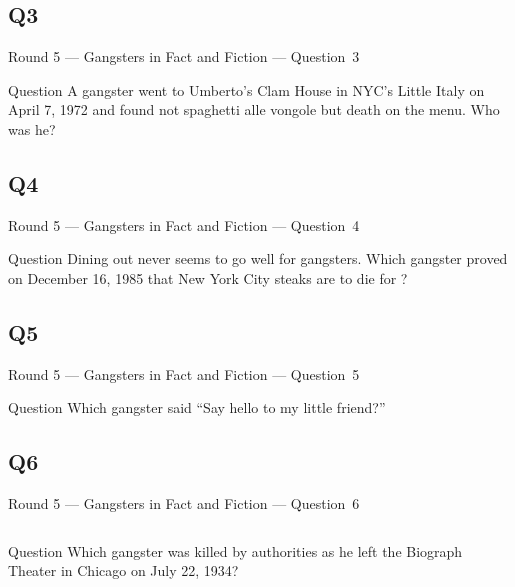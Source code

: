 \documentclass[11pt]{beamer}
\begin{document}
\subsection*{Q3}
\begin{frame}[t]{Round 5 --- Gangsters in Fact and Fiction --- \mbox{Question 3}}
\begin{block}{Question}
A gangster went to Umberto's Clam House in NYC's Little Italy on April 7, 1972 and found not spaghetti alle vongole but death on the menu.  Who was he?
\end{block}
\end{frame}
\subsection*{Q4}
\begin{frame}[t]{Round 5 --- Gangsters in Fact and Fiction --- \mbox{Question 4}}
\begin{block}{Question}
Dining out never seems to go well for gangsters. Which gangster proved on December 16, 1985 that New York City steaks are to die for ?
\end{block}
\end{frame}
\subsection*{Q5}
\begin{frame}[t]{Round 5 --- Gangsters in Fact and Fiction --- \mbox{Question 5}}
\begin{block}{Question}
Which gangster said ``Say hello to my little friend?''
\end{block}
\end{frame}
\subsection*{Q6}
\begin{frame}[t]{Round 5 --- Gangsters in Fact and Fiction --- \mbox{Question 6}}
\begin{columns}[T,totalwidth=\linewidth]
\begin{column}{0.32\linewidth}
\begin{block}{Question}
Which gangster was killed by authorities as he left the Biograph Theater in Chicago on July 22, 1934?
\end{block}
\end{column}
\begin{column}{0.65\linewidth}
\begin{center}
\texttt{[image: \{Images/biograph]}.jpg}
\end{center}
\end{column}
\end{columns}
\end{frame}
\end{document}
